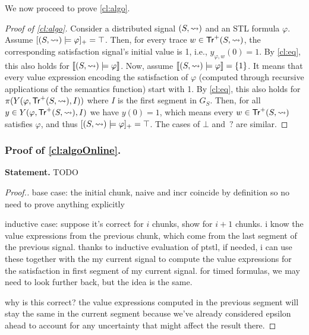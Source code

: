We now proceed to prove \cref{cl:algo}.

\begin{proof}[\normalsize Proof of \cref{cl:algo}]
	\normalsize
	Consider a distributed signal $(S,{\rightsquigarrow})$ and an STL formula $\varphi$.
	Assume $[(S,{\rightsquigarrow}) \models \varphi]_+ = \top$.
	Then, for every trace $w \in \mathsf{Tr}^+(S,{\rightsquigarrow})$, the corresponding satisfaction signal's initial value is 1, i.e., $y_{\varphi,w}(0) = 1$.
	By \cref{cl:eq}, this also holds for $\llbracket (S, {\rightsquigarrow}) \models \varphi \rrbracket$.
	Now, assume  $\llbracket (S, {\rightsquigarrow}) \models \varphi \rrbracket = \{1\}$.
	It means that every value expression encoding the satisfaction of $\varphi$ (computed through recursive applications of the semantics function) start with 1.
	By \cref{cl:eq}, this also holds for $\pi(Y(\varphi, \mathsf{Tr}^+(S,{\rightsquigarrow}), I))$ where $I$ is the first segment in $G_S$.
	Then, for all $y \in Y(\varphi, \mathsf{Tr}^+(S,{\rightsquigarrow}), I)$ we have $y(0) = 1$, which means every $w \in \mathsf{Tr}^+(S,{\rightsquigarrow})$ satisfies $\varphi$, and thus $[(S,{\rightsquigarrow}) \models \varphi]_+ = \top$.
	The cases of $\bot$ and ${\,?}$ are similar.
\end{proof}

\subsubsection*{Proof of \cref{cl:algoOnline}.}
\textbf{Statement.} TODO

\begin{proof}[\normalsize Proof.]
	\normalsize
	
	base case: the initial chunk, naive and incr coincide by definition so no need to prove anything explicitly
	
	inductive case: suppose it's correct for $i$ chunks, show for $i+1$ chunks.
	i know the value expressions from the previous chunk, which come from the last segment of the previous signal.
	thanks to inductive evaluation of ptstl, if needed, i can use these together with the my current signal to compute the value expressions for the satisfaction in first segment of my current signal.
	for timed formulas, we may need to look further back, but the idea is the same.
	
	why is this correct?
	the value expressions computed in the previous segment will stay the same in the current segment because we've already considered epsilon ahead to account for any uncertainty that might affect the result there.	
\end{proof}

